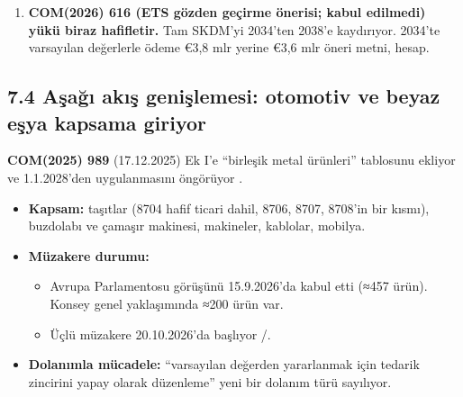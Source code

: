 \begin{enumerate}
  \begin{itemize}
  \tightlist
  \item
    2026 ithalatı için ilk beyan ve sertifika teslimi 30.9.2027'de.
  \item
    Varsayılan değerler Aralık 2027'ye kadar gözden geçirilecek.
  \item
    Aşağı akış genişlemesi önerisi 1.1.2028'den uygulanacak. Bu, T2028 ile aynı gün.
  \item
    Doğrulama ve veri hamleleri bu yüzden çıkış takviminden önce sonuç verir.
  \end{itemize}
\item
  \textbf{COM(2026) 616 (ETS gözden geçirme önerisi; kabul edilmedi) yükü biraz hafifletir.} Tam SKDM'yi 2034'ten 2038'e kaydırıyor. 2034'te varsayılan değerlerle ödeme €3,8 mlr yerine €3,6 mlr \etiketV{} öneri metni, \etiketT{} hesap.
\end{enumerate}

\hypertarget{02c_hazirlik-74-aux15faux11fux131-akux131ux15f-geniux15flemesi-otomotiv-ve-beyaz-eux15fya-kapsama-giriyor}{%
\subsection{7.4 Aşağı akış genişlemesi: otomotiv ve beyaz eşya kapsama giriyor}\label{02c_hazirlik-74-aux15faux11fux131-akux131ux15f-geniux15flemesi-otomotiv-ve-beyaz-eux15fya-kapsama-giriyor}}

\textbf{COM(2025) 989} (17.12.2025) Ek I'e ``birleşik metal ürünleri'' tablosunu ekliyor ve 1.1.2028'den uygulanmasını öngörüyor \etiketV{}.

\begin{itemize}
\tightlist
\item
  \textbf{Kapsam:} taşıtlar (8704 hafif ticari dahil, 8706, 8707, 8708'in bir kısmı), buzdolabı ve çamaşır makinesi, makineler, kablolar, mobilya.
\item
  \textbf{Müzakere durumu:}

  \begin{itemize}
  \tightlist
  \item
    Avrupa Parlamentosu görüşünü 15.9.2026'da kabul etti (≈457 ürün). Konsey genel yaklaşımında ≈200 ürün var.
  \item
    Üçlü müzakere 20.10.2026'da başlıyor \etiketV{}/\etiketT{}.
  \end{itemize}
\item
  \textbf{Dolanımla mücadele:} ``varsayılan değerden yararlanmak için tedarik zincirini yapay olarak düzenleme'' yeni bir dolanım türü sayılıyor.
\end{itemize}

